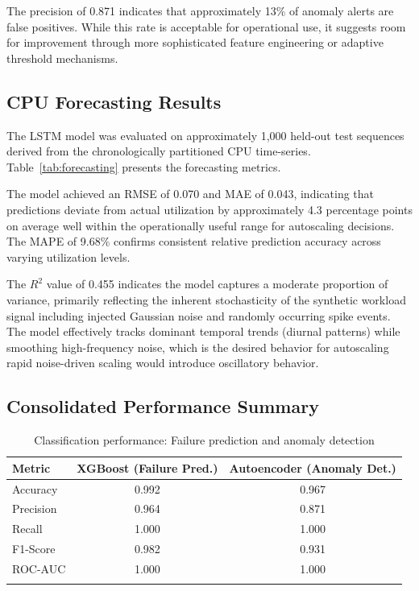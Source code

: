 \documentclass[sn-nature]{sn-jnl}
\theoremstyle{thmstyleone}
\theoremstyle{thmstyletwo}
\theoremstyle{thmstylethree}
\begin{document}
The precision of 0.871 indicates that approximately 13\% of anomaly alerts are false positives. While this rate is acceptable for operational use, it suggests room for improvement through more sophisticated feature engineering or adaptive threshold mechanisms.

\subsection{CPU Forecasting Results}\label{subsec:cpuresults}

The LSTM model was evaluated on approximately 1,000 held-out test sequences derived from the chronologically partitioned CPU time-series. Table~\ref{tab:forecasting} presents the forecasting metrics.

The model achieved an RMSE of 0.070 and MAE of 0.043, indicating that predictions deviate from actual utilization by approximately 4.3 percentage points on average well within the operationally useful range for autoscaling decisions. The MAPE of 9.68\% confirms consistent relative prediction accuracy across varying utilization levels.

The $R^2$ value of 0.455 indicates the model captures a moderate proportion of variance, primarily reflecting the inherent stochasticity of the synthetic workload signal including injected Gaussian noise and randomly occurring spike events. The model effectively tracks dominant temporal trends (diurnal patterns) while smoothing high-frequency noise, which is the desired behavior for autoscaling rapid noise-driven scaling would introduce oscillatory behavior.

\subsection{Consolidated Performance Summary}\label{subsec:consolidated}

\begin{table}[htbp]
\centering
\caption{Classification performance: Failure prediction and anomaly detection}\label{tab:classification}
\begin{tabular}{lcc}
\toprule
\textbf{Metric} & \textbf{XGBoost (Failure Pred.)} & \textbf{Autoencoder (Anomaly Det.)} \\
\midrule
Accuracy & 0.992 & 0.967 \\
Precision & 0.964 & 0.871 \\
Recall & 1.000 & 1.000 \\
F1-Score & 0.982 & 0.931 \\
ROC-AUC & 1.000 & 1.000 \\
\botrule
\end{tabular}
\end{table}
\end{document}
